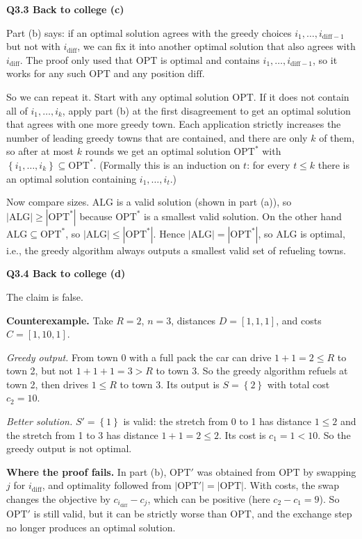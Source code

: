 \documentclass[11pt]{article}
\newcommand{\set}[1]{\left\{#1\right\}}
\newcommand{\abs}[1]{\left|#1\right|}
\newcommand{\OPT}{\mathrm{OPT}}
\newcommand{\ALG}{\mathrm{ALG}}
\newcommand{\qpage}[1]{\clearpage\noindent\textbf{\large #1}\par\medskip}
\begin{document}
\qpage{Q3.3 Back to college (c)}

Part (b) says: if an optimal solution agrees with the greedy choices $i_1,\dots,i_{\text{diff}-1}$ but not with $i_{\text{diff}}$, we can fix it into another optimal solution that also agrees with $i_{\text{diff}}$.
The proof only used that $\OPT$ is optimal and contains $i_1,\dots,i_{\text{diff}-1}$, so it works for any such $\OPT$ and any position $\text{diff}$.

So we can repeat it.
Start with any optimal solution $\OPT$.
If it does not contain all of $i_1,\dots,i_k$, apply part (b) at the first disagreement to get an optimal solution that agrees with one more greedy town.
Each application strictly increases the number of leading greedy towns that are contained, and there are only $k$ of them, so after at most $k$ rounds we get an optimal solution $\OPT^*$ with $\set{i_1,\dots,i_k} \subseteq \OPT^*$.
(Formally this is an induction on $t$: for every $t \le k$ there is an optimal solution containing $i_1,\dots,i_t$.)

Now compare sizes.
$\ALG$ is a valid solution (shown in part (a)), so $\abs{\ALG} \ge \abs{\OPT^*}$ because $\OPT^*$ is a smallest valid solution.
On the other hand $\ALG \subseteq \OPT^*$, so $\abs{\ALG} \le \abs{\OPT^*}$.
Hence $\abs{\ALG} = \abs{\OPT^*}$, so $\ALG$ is optimal, i.e., the greedy algorithm always outputs a smallest valid set of refueling towns.
    

\qpage{Q3.4 Back to college (d)}

The claim is false.

\textbf{Counterexample.}
Take $R = 2$, $n = 3$, distances $D = [1,1,1]$, and costs $C = [1, 10, 1]$.

\emph{Greedy output.}
From town 0 with a full pack the car can drive $1+1 = 2 \le R$ to town 2, but not $1+1+1 = 3 > R$ to town 3.
So the greedy algorithm refuels at town 2, then drives $1 \le R$ to town 3.
Its output is $S = \set{2}$ with total cost $c_2 = 10$.

\emph{Better solution.}
$S' = \set{1}$ is valid: the stretch from 0 to 1 has distance $1 \le 2$ and the stretch from 1 to 3 has distance $1+1 = 2 \le 2$.
Its cost is $c_1 = 1 < 10$.
So the greedy output is not optimal.

\textbf{Where the proof fails.}
In part (b), $\OPT'$ was obtained from $\OPT$ by swapping $j$ for $i_{\text{diff}}$, and optimality followed from $\abs{\OPT'} = \abs{\OPT}$.
With costs, the swap changes the objective by $c_{i_{\text{diff}}} - c_j$, which can be positive (here $c_2 - c_1 = 9$).
So $\OPT'$ is still valid, but it can be strictly worse than $\OPT$, and the exchange step no longer produces an optimal solution.
    
\end{document}
